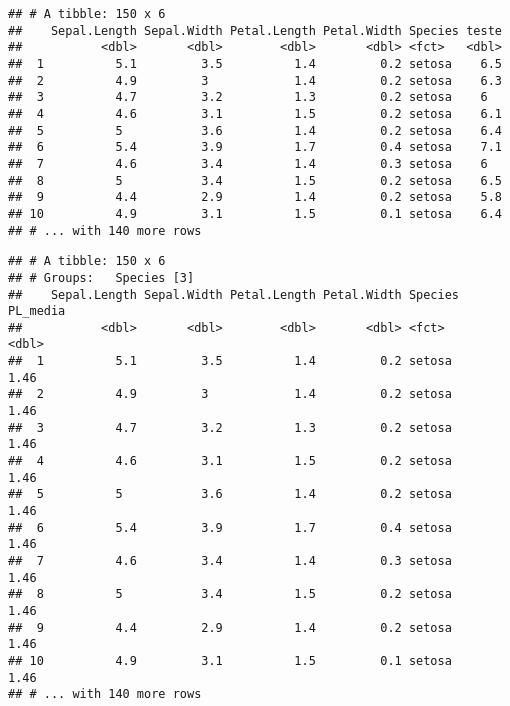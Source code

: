 \documentclass[]{book}
\newenvironment{Shaded}{\begin{snugshade}}{\end{snugshade}}
\newcommand{\DataTypeTok}[1]{\textcolor[rgb]{0.13,0.29,0.53}{#1}}
\newcommand{\KeywordTok}[1]{\textcolor[rgb]{0.13,0.29,0.53}{\textbf{#1}}}
\newcommand{\NormalTok}[1]{#1}
\newcommand{\OperatorTok}[1]{\textcolor[rgb]{0.81,0.36,0.00}{\textbf{#1}}}
\newcommand{\StringTok}[1]{\textcolor[rgb]{0.31,0.60,0.02}{#1}}
\begin{document}
\begin{Shaded}
\end{Shaded}

\begin{verbatim}
## # A tibble: 150 x 6
##    Sepal.Length Sepal.Width Petal.Length Petal.Width Species teste
##           <dbl>       <dbl>        <dbl>       <dbl> <fct>   <dbl>
##  1          5.1         3.5          1.4         0.2 setosa    6.5
##  2          4.9         3            1.4         0.2 setosa    6.3
##  3          4.7         3.2          1.3         0.2 setosa    6  
##  4          4.6         3.1          1.5         0.2 setosa    6.1
##  5          5           3.6          1.4         0.2 setosa    6.4
##  6          5.4         3.9          1.7         0.4 setosa    7.1
##  7          4.6         3.4          1.4         0.3 setosa    6  
##  8          5           3.4          1.5         0.2 setosa    6.5
##  9          4.4         2.9          1.4         0.2 setosa    5.8
## 10          4.9         3.1          1.5         0.1 setosa    6.4
## # ... with 140 more rows
\end{verbatim}

\begin{Shaded}
\end{Shaded}

\begin{verbatim}
## # A tibble: 150 x 6
## # Groups:   Species [3]
##    Sepal.Length Sepal.Width Petal.Length Petal.Width Species PL_media
##           <dbl>       <dbl>        <dbl>       <dbl> <fct>      <dbl>
##  1          5.1         3.5          1.4         0.2 setosa      1.46
##  2          4.9         3            1.4         0.2 setosa      1.46
##  3          4.7         3.2          1.3         0.2 setosa      1.46
##  4          4.6         3.1          1.5         0.2 setosa      1.46
##  5          5           3.6          1.4         0.2 setosa      1.46
##  6          5.4         3.9          1.7         0.4 setosa      1.46
##  7          4.6         3.4          1.4         0.3 setosa      1.46
##  8          5           3.4          1.5         0.2 setosa      1.46
##  9          4.4         2.9          1.4         0.2 setosa      1.46
## 10          4.9         3.1          1.5         0.1 setosa      1.46
## # ... with 140 more rows
\end{verbatim}
\end{document}
